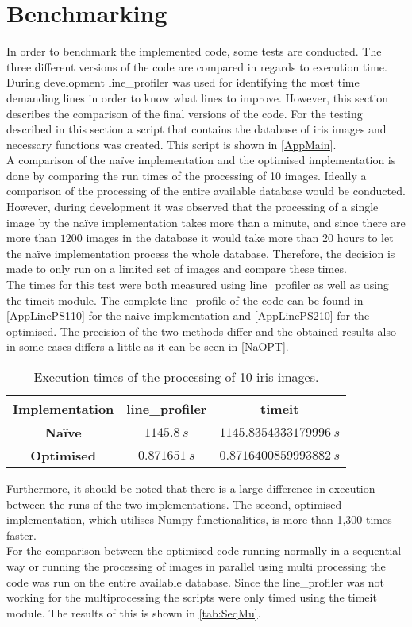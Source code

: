 \section{Benchmarking}
In order to benchmark the implemented code, some tests are conducted. The three different versions of the code are compared in regards to execution time. During development line_profiler was used for identifying the most time demanding lines in order to know what lines to improve. However, this section describes the comparison of the final versions of the code. For the testing described in this section a script that contains the database of iris images and necessary functions was created. This script is shown in \autoref{AppMain}. \\
A comparison of the na\"ive implementation and the optimised implementation is done by comparing the run times of the processing of 10 images. Ideally a comparison of the processing of the entire available database would be conducted. However, during development it was observed that the processing of a single image by the na\"ive implementation takes more than a minute, and since there are more than $ 1200 $ images in the database it would take more than 20 hours to let the na\"ive implementation process the whole database. Therefore, the decision is made to only run on a limited set of images and compare these times. \\
The times for this test were both measured using line_profiler as well as using the timeit module. The complete line_profile of the code can be found in \autoref{AppLinePS110} for the naive implementation and \autoref{AppLinePS210} for the optimised.  The precision of the two methods differ and the obtained results also in some cases differs a little as it can be seen in \autoref{NaOPT}.  

\begin{table}[H]
\centering
\caption{Execution times of the processing of 10 iris images. }
\label{NaOPT}
\begin{tabular}{ |c|c|c| }
\hline
\textbf{Implementation}&\textbf{line_profiler}&\textbf{timeit} \\
\hline
\textbf{Na\"ive}&$1145.8~s$&$1145.8354333179996~s$\\
\hline
\textbf{Optimised}&$0.871651~s$&$0.8716400859993882~s$\\
\hline
\end{tabular}
\end{table}

\noindent
Furthermore, it should be noted that there is a large difference in execution  between the runs of the two implementations. The second, optimised implementation, which utilises Numpy functionalities, is more than 1,300 times faster. \\
For the comparison between the optimised code running normally in a sequential way or running the processing of images in parallel using multi processing the code was run on the entire available database. Since the line_profiler was not working for the multiprocessing the scripts were only timed using the timeit module. The results of this is shown in \autoref{tab:SeqMu}.

